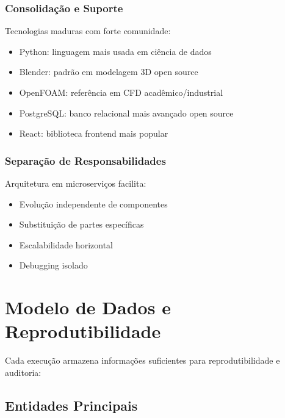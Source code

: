 \subsubsection{Consolidação e Suporte}

Tecnologias maduras com forte comunidade:
\begin{itemize}
    \item Python: linguagem mais usada em ciência de dados
    \item Blender: padrão em modelagem 3D open source
    \item OpenFOAM: referência em CFD acadêmico/industrial
    \item PostgreSQL: banco relacional mais avançado open source
    \item React: biblioteca frontend mais popular
\end{itemize}

\subsubsection{Separação de Responsabilidades}

Arquitetura em microserviços facilita:
\begin{itemize}
    \item Evolução independente de componentes
    \item Substituição de partes específicas
    \item Escalabilidade horizontal
    \item Debugging isolado
\end{itemize}

\section{Modelo de Dados e Reprodutibilidade}

Cada execução armazena informações suficientes para reprodutibilidade e auditoria:

\subsection{Entidades Principais}

